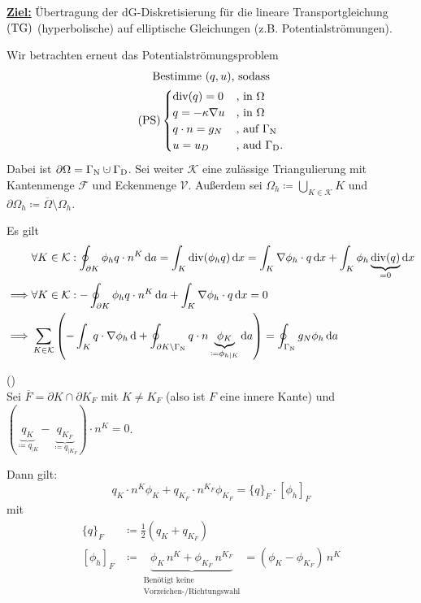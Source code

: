 
\underline{\textbf{Ziel:}} Übertragung der dG-Diskretisierung für die lineare Transportgleichung $ \operatorname{(TG)} $ (hyperbolische) auf elliptische Gleichungen (z.B. Potentialströmungen).

Wir betrachten erneut das Potentialströmungsproblem
\begin{gather*}
	\text{Bestimme } (q, u) \text{, sodass}\\
	\operatorname{(PS)} \begin{cases}
		\operatorname{div}(q) = 0 &\text{, in }\Omega\\
		q = - \kappa \nabla u &\text{, in } \Omega\\
		q \cdot n = g_N &\text{, auf }\Gamma_{\text{N}}\\
		u = u_D &\text{, aud } \Gamma_{\text{D}}. 
	\end{cases}
\end{gather*}
Dabei ist $ \partial \Omega = \GammaN \cupdot \GammaD $. Sei weiter $ \mathcal{K} $ eine zulässige Triangulierung mit Kantenmenge $ \mathcal{F} $ und Eckenmenge $ \mathcal{V} $. Außerdem sei $ \Omega_h \coloneqq \bigcup_{K \in \mathcal{K}} K$ und $ \partial \Omega_h \coloneqq \overline{\Omega} \setminus \Omega_h $.

Es gilt 
\begin{align*}
	&\forall K \in \mathcal{K}: \oint_{\partial K} \phi_h q \cdot n^K \diff a = \int_K \dive(\phi_h q) \diff x = \int_K \nabla\phi_h \cdot q \diff x + \int_K \phi_h \underbrace{\dive(q)}_{=0} \diff x\\
	\implies &\forall K \in \mathcal{K}: -\oint_{\partial K} \phi_h q \cdot n^K \diff a + \int_K \nabla\phi_h \cdot q \diff x  = 0 \\
	\implies &\sum_{K \in \mathcal{K}} \left( - \int_K q \cdot \nabla \phi_h \diff + \oint_{\partial K \setminus \GammaN} q \cdot n \underbrace{\phi_K}_{\coloneqq \phi_{h|K}} \diff a  \right) = \oint_{\GammaN} g_N \phi_h \diff a
\end{align*}

\begin{Satz}()\\
	Sei $ \overline{F} = \partial K \cap \partial K_F $ mit $ K \ne K_F $ (also ist $ F $ eine innere Kante) und $ ( \underbrace{q_{K} }_{\coloneqq q_{|K}}- \underbrace{q_{K_F}}_{\coloneqq q_{|K_F}} )  \cdot n^K = 0$.
	
	Dann gilt:
	\[ q_K \cdot n^K \phi_K + q_{K_F} \cdot n^{K_F} \phi_{K_F} = \{q\}_F \cdot [\phi_h]_F \]
	mit
	\begin{align*}
		\{q\}_F &\coloneqq \frac{1}{2} (q_K + q_{K_F})\\
		[\phi_h]_F &\coloneqq \underbrace{\phi_K \, n^K + \phi_{K_F} \, n^{K_F}}_{\substack{\text{Benötigt keine}\\ \text{Vorzeichen-/Richtungswahl}}} = (\phi_K - \phi_{K_F}) \, n^K
	\end{align*}
\end{Satz}

